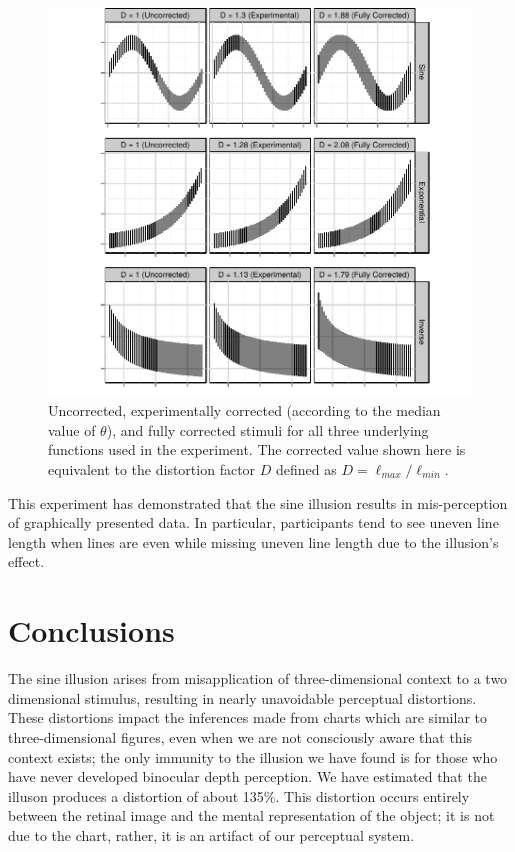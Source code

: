 \documentclass[11pt]{isuthesis}\usepackage[]{graphicx}\usepackage[]{color}
\begin{document}
\begin{figure}[tp]\centering
\includegraphics[width=.8\linewidth,trim=.25in 0in .25in 0in]{fig-allOptimalWeights} 
\caption[Experimentally corrected stimuli]{Uncorrected, experimentally corrected (according to the median value of $\theta$), and fully corrected stimuli for all three underlying functions used in the experiment. The corrected value shown here is equivalent to the distortion factor $D$ defined as $D=\ell_{max}/\ell_{min}$.}\label{fig:allCorrectionOptimal}
\end{figure}
This experiment has demonstrated that the sine illusion results in mis-perception of graphically presented data. In particular, participants tend to see uneven line length when lines are even while missing uneven line length due to the illusion's effect. 

\section{Conclusions}
The sine illusion arises from misapplication of three-dimensional context to a two dimensional stimulus, resulting in nearly unavoidable perceptual distortions. These distortions impact the inferences made from charts which are similar to three-dimensional figures, even when we are not consciously aware that this context exists; the only immunity to the illusion we have found is for those who have never developed binocular depth perception. We have estimated that the illuson produces a distortion of about 135\%. This distortion occurs entirely between the retinal image and the mental representation of the object; it is not due to the chart, rather, it is an artifact of our perceptual system. 
\end{document}
